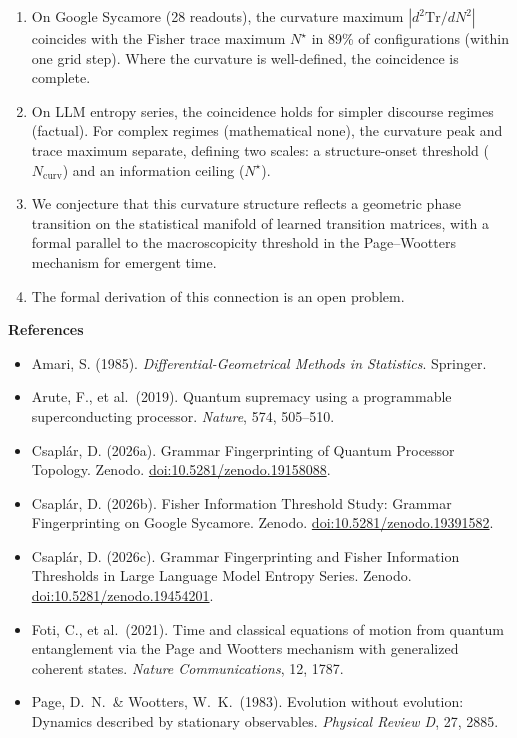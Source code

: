 \documentclass[11pt,a4paper]{article}
\begin{document}
\begin{enumerate}\setlength\itemsep{0.25em}
\item On Google Sycamore (28 readouts), the curvature maximum $|d^2\mathrm{Tr}/dN^2|$ coincides with the Fisher trace maximum $N^\star$ in 89\% of configurations (within one grid step). Where the curvature is well-defined, the coincidence is complete.
\item On LLM entropy series, the coincidence holds for simpler discourse regimes (factual). For complex regimes (mathematical none), the curvature peak and trace maximum separate, defining two scales: a structure-onset threshold ($N_{\mathrm{curv}}$) and an information ceiling ($N^\star$).
\item We conjecture that this curvature structure reflects a geometric phase transition on the statistical manifold of learned transition matrices, with a formal parallel to the macroscopicity threshold in the Page--Wootters mechanism for emergent time.
\item The formal derivation of this connection is an open problem.
\end{enumerate}

\vspace{0.6em}
\noindent\textbf{References}

\begin{itemize}\setlength\itemsep{0.2em}
\item Amari, S. (1985). \textit{Differential-Geometrical Methods in Statistics}. Springer.
\item Arute, F., et al.\ (2019). Quantum supremacy using a programmable superconducting processor. \textit{Nature}, 574, 505--510.
\item Csapl\'ar, D. (2026a). Grammar Fingerprinting of Quantum Processor Topology. Zenodo. \href{https://doi.org/10.5281/zenodo.19158088}{doi:10.5281/zenodo.19158088}.
\item Csapl\'ar, D. (2026b). Fisher Information Threshold Study: Grammar Fingerprinting on Google Sycamore. Zenodo. \href{https://doi.org/10.5281/zenodo.19391582}{doi:10.5281/zenodo.19391582}.
\item Csapl\'ar, D. (2026c). Grammar Fingerprinting and Fisher Information Thresholds in Large Language Model Entropy Series. Zenodo. \href{https://doi.org/10.5281/zenodo.19454201}{doi:10.5281/zenodo.19454201}.
\item Foti, C., et al.\ (2021). Time and classical equations of motion from quantum entanglement via the Page and Wootters mechanism with generalized coherent states. \textit{Nature Communications}, 12, 1787.
\item Page, D.\ N.\ \& Wootters, W.\ K.\ (1983). Evolution without evolution: Dynamics described by stationary observables. \textit{Physical Review D}, 27, 2885.
\end{itemize}
\end{document}
